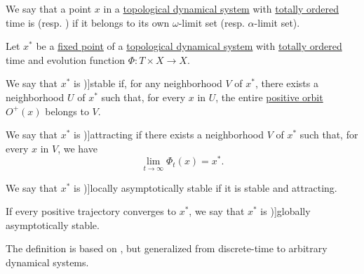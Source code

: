 \begin{definition}\label{def:dynamical_system_recurrent_point}
  We say that a point \( x \) in a \hyperref[def:topological_dynamical_system]{topological dynamical system} with \hyperref[def:totally_ordered_set]{totally ordered} time is  (resp. ) if it belongs to its own \( \omega \)-limit set (resp. \( \alpha \)-limit set).
\end{definition}

\begin{definition}\label{def:dynamical_system_stability}\mimprovised
  Let \( x^* \) be a \hyperref[def:dynamical_system_fixed_point]{fixed point} of a \hyperref[def:topological_dynamical_system]{topological dynamical system} with \hyperref[def:totally_ordered_set]{totally ordered} time and evolution function \( \Phi: T \times X \to X \).

  \begin{thmenum}
     We say that \( x^* \) is \term[en=stable (fixed point) (\cite[def. 1.2(1)]{Elaydi2007DiscreteChaos})]{stable} if, for any neighborhood \( V \) of \( x^* \), there exists a neighborhood \( U \) of \( x^* \) such that, for every \( x \) in \( U \), the entire \hyperref[def:dynamical_system_trajectory]{positive orbit} \( O^+(x) \) belongs to \( V \).

     We say that \( x^* \) is \term[en=attracting (fixed point) (\cite[def. 1.2(2)]{Elaydi2007DiscreteChaos})]{attracting} if there exists a neighborhood \( V \) of \( x^* \) such that, for every \( x \) in \( V \), we have
    \begin{equation*}
      \lim_{t \to \infty} \Phi_t(x) = x^*.
    \end{equation*}

     We say that \( x^* \) is \term[en=asymptotically stable (fixed point) (\cite[def. 1.2(3)]{Elaydi2007DiscreteChaos})]{locally asymptotically stable} if it is stable and attracting.

     If every positive trajectory converges to \( x^* \), we say that \( x^* \) is \term[en=globally asymptotically stable (fixed point) (\cite[def. 1.2(3)]{Elaydi2007DiscreteChaos})]{globally asymptotically stable}.
  \end{thmenum}
\end{definition}
\begin{comments}
  \item The definition is based on \cite[def. 1.2]{Elaydi2007DiscreteChaos}, but generalized from discrete-time to arbitrary dynamical systems.
\end{comments}

